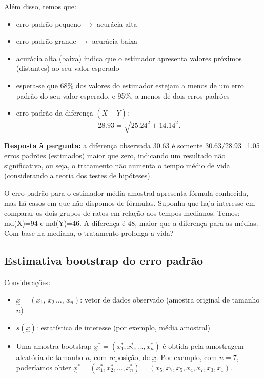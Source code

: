 \documentclass[
  letterpaper,
  DIV=11,
  numbers=noendperiod]{scrreprt}
\begin{document}
Além disso, temos que:

\begin{itemize}
\item
  erro padrão pequeno \(\longrightarrow\) acurácia alta
\item
  erro padrão grande \(\longrightarrow\) acurácia baixa
\item
  acurácia alta (baixa) indica que o estimador apresenta valores
  próximos (distantes) ao seu valor esperado
\item
  espera-se que 68\(\%\) dos valores do estimador estejam a menos de um
  erro padrão do seu valor esperado, e 95\(\%\), a menos de dois erros
  padrões
\item
  erro padrão da diferença \((\bar{X}-\bar{Y})\):
  \[28.93=\sqrt{25.24^2+14.14^2}.\]
\end{itemize}

\textbf{Resposta à pergunta:} a diferença observada 30.63 é somente
30.63/28.93=1.05 erros padrões (estimados) maior que zero, indicando um
resultado não significativo, ou seja, o tratamento não aumenta o tempo
médio de vida (considerando a teoria dos testes de hipóteses).

O erro padrão para o estimador média amostral apresenta fórmula
conhecida, mas há casos em que não dispomos de fórmulas. Suponha que
haja interesse em comparar os dois grupos de ratos em relação aos tempos
medianos. Temos: md(X)=94 e md(Y)=46. A diferença é 48, maior que a
diferença para as médias. Com base na mediana, o tratamento prolonga a
vida?

\subsection{Estimativa bootstrap do erro
padrão}\label{estimativa-bootstrap-do-erro-padruxe3o}

Considerações:

\begin{itemize}
\item
  \(\underset{\sim}{x} = (x_1,\,x_2\,\ldots,\,x_n)\): vetor de dados
  observado (amostra original de tamanho \(n\))
\item
  \(s(\underset{\sim}{x})\): estatística de interesse (por exemplo,
  média amostral)
\item
  Uma amostra bootstrap
  \(\underset{\sim}{x}^*=(x_1^*, x_2^*, \ldots, x_n^*)\) é obtida pela
  amostragem aleatória de tamanho \(n\), com reposição, de
  \(\underset{\sim}{x}\). Por exemplo, com \(n=7\), poderíamos obter
  \(\underset{\sim}{x}^*=(x_1^*, x_2^*, \ldots, x_n^*)=(x_5, x_7, x_5, x_4, x_7, x_3, x_1)\).
\end{itemize}
\end{document}
